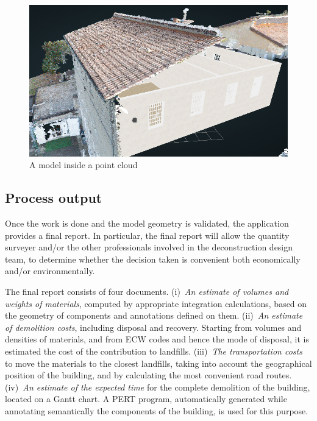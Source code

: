 \documentclass[a4paper,twoside]{article}
\begin{document}
\begin{figure}[htbp] %
   \centering
   \includegraphics[width=1\linewidth]{images/augmented}
   \caption{A model inside a point cloud}
   \label{fig:augmented}
\end{figure}

\subsection{Process output}

\noindent 
Once the work is done and the model geometry is validated, the application provides a final report.
In particular, the final report will allow the quantity surveyer and/or the other professionals involved in the deconstruction design team, to determine whether the decision taken is convenient both economically and/or environmentally.

The final report consists of four documents.
(i)~\emph{An estimate of volumes and weights of materials}, computed by appropriate integration calculations, based on the geometry of components and annotations defined on them.
(ii)~\emph{An estimate of demolition costs}, including disposal and recovery.
Starting from volumes and densities of materials, and from ECW codes and hence the mode of disposal, it is estimated the cost of the contribution to landfills.
(iii)~\emph{The transportation costs} to move the materials to the closest landfills, taking into account the geographical position of the building, and by calculating the most convenient road routes.
(iv)~\emph{An estimate of the expected time} for the complete demolition of the building, located on a Gantt chart. A PERT program, automatically generated while annotating semantically the components of the building, is used for this purpose.
\end{document}
